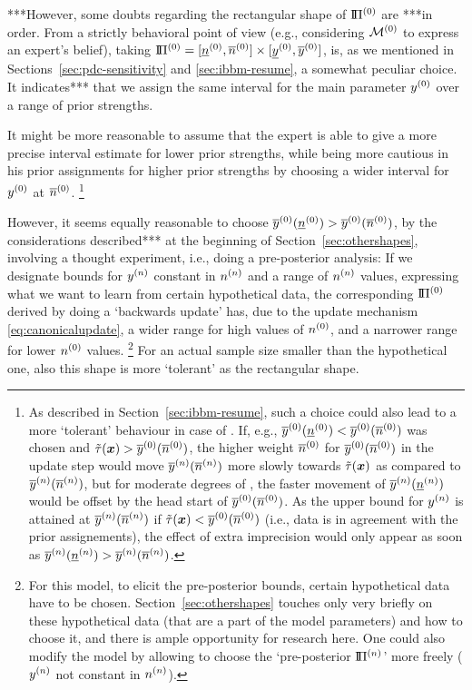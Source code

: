 ***However, some doubts regarding the rectangular shape of $\text{I}\!\Pi^{(0)}$ are ***in order.
From a strictly behavioral point of view
(e.g., considering $\mathcal{M}^{(0)}$ to express an expert's belief),
taking $\text{I}\!\Pi^{(0)} = [\underline{n}^{(0)}, \overline{n}^{(0)}] \times [\underline{y}^{(0)}, \overline{y}^{(0)}]$,
is, as we mentioned in Sections~\ref{sec:pdc-sensitivity} and \ref{sec:ibbm-resume}, a somewhat peculiar choice.
It indicates*** that we assign the same interval for the main parameter $y^{(0)}$
over a range of prior strengths.

It might be more reasonable to assume that the expert is able to give
a more precise interval estimate for lower prior strengths,
while being more cautious in his prior assignments for higher prior strengths
by choosing a wider interval for $y^{(0)}$ at $\overline{n}^{(0)}$.%
\footnote{As described in Section~\ref{sec:ibbm-resume},
such a choice could also lead to a more `tolerant' behaviour in case of \pdc.
If, e.g., $\overline{y}^{(0)}(\underline{n}^{(0)}) < \overline{y}^{(0)}(\overline{n}^{(0)})$ was chosen and $\tilde{\tau}({\bm x}) > \overline{y}^{(0)}(\overline{n}^{(0)})$,
the higher weight $\overline{n}^{(0)}$ for $\overline{y}^{(0)}(\overline{n}^{(0)})$ in the update step
would move $\overline{y}^{(n)}(\overline{n}^{(n)})$ more slowly towards $\tilde{\tau}({\bm x})$ as compared to $\overline{y}^{(n)}(\overline{n}^{(n)})$,
but for moderate degrees of \pdc, the faster movement of $\overline{y}^{(n)}(\underline{n}^{(n)})$
would be offset by the head start of $\overline{y}^{(0)}(\overline{n}^{(0)})$.
As the upper bound for $y^{(n)}$ is attained at $\overline{y}^{(n)}(\overline{n}^{(n)})$
if $\tilde{\tau}({\bm x}) < \overline{y}^{(0)}(\overline{n}^{(0)})$ (i.e., data is in agreement with the prior assignements),
the effect of extra imprecision would only appear as soon as $\overline{y}^{(n)}(\underline{n}^{(n)}) > \overline{y}^{(n)}(\overline{n}^{(n)})$.}

However, it seems equally reasonable to choose $\overline{y}^{(0)}(\underline{n}^{(0)}) > \overline{y}^{(0)}(\overline{n}^{(0)})$,
by the considerations described*** at the beginning of Section~\ref{sec:othershapes},
involving a thought experiment, i.e., doing a pre-posterior analysis:
If we designate bounds for $y^{(n)}$ constant in $n^{(n)}$ and a range of $n^{(n)}$ values,
expressing what we want to learn from certain hypothetical data,
the corresponding $\text{I}\!\Pi^{(0)}$ derived by doing a `backwards update' has,
due to the update mechanism \eqref{eq:canonicalupdate},
a wider range for high values of $n^{(0)}$, and a narrower range for lower $n^{(0)}$ values.%
\footnote{For this model, to elicit the pre-posterior bounds, certain hypothetical data have to be chosen.
Section~\ref{sec:othershapes} touches only very briefly on these hypothetical data
(that are a part of the model parameters) and how to choose it,
and there is ample opportunity for research here.
One could also modify the model by allowing to choose
the `pre-posterior $\text{I}\!\Pi^{(n)}$' more freely ($y^{(n)}$ not constant in $n^{(n)}$).}
For an actual sample size smaller than the hypothetical one,
also this shape is more `tolerant' as the rectangular shape.

